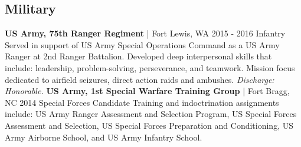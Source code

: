 \documentclass{article}
\begin{document}
\begin{bgbox}[
        height = \paperheight,
        width = 0.69\textwidth,
        colback = white
    ]
{            \section*{Military}
                \textbf{US Army, 75th Ranger Regiment} | Fort Lewis, WA \hfill{2015 - 2016}\newline
                        Infantry\newline\newline
                            Served in support of US Army Special Operations Command as a US Army Ranger at 2nd Ranger Battalion. Developed deep interpersonal skills that include: leadership, problem-solving, perseverance, and teamwork. Mission focus dedicated to airfield seizures, direct action raids and ambushes. \textit{Discharge: Honorable.}\newline\newline
                \textbf{US Army, 1st Special Warfare Training Group} | Fort Bragg, NC \hfill{2014}\newline
                        Special Forces Candidate\newline\newline
                            Training and indoctrination assignments include: US Army Ranger Assessment and Selection Program, US Special Forces Assessment and Selection, US Special Forces Preparation and Conditioning, US Army Airborne School, and US Army Infantry School.\newline
            \mbox{}
            \vfill
        }
    \end{bgbox}
\end{document}
